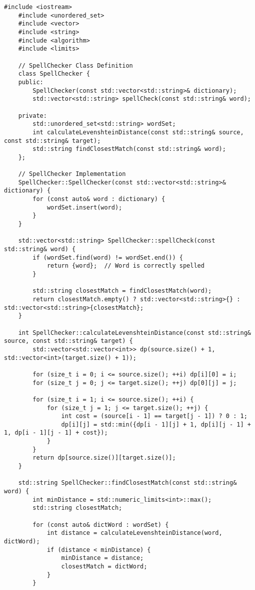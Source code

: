\documentclass{article}
\begin{document}
\begin{lstlisting}[caption={main.cpp}, label={lst:main}]
    #include <iostream>
    #include <unordered_set>
    #include <vector>
    #include <string>
    #include <algorithm>
    #include <limits>
    
    // SpellChecker Class Definition
    class SpellChecker {
    public:
        SpellChecker(const std::vector<std::string>& dictionary);
        std::vector<std::string> spellCheck(const std::string& word);
    
    private:
        std::unordered_set<std::string> wordSet;
        int calculateLevenshteinDistance(const std::string& source, const std::string& target);
        std::string findClosestMatch(const std::string& word);
    };
    
    // SpellChecker Implementation
    SpellChecker::SpellChecker(const std::vector<std::string>& dictionary) {
        for (const auto& word : dictionary) {
            wordSet.insert(word);
        }
    }
    
    std::vector<std::string> SpellChecker::spellCheck(const std::string& word) {
        if (wordSet.find(word) != wordSet.end()) {
            return {word};  // Word is correctly spelled
        }
        
        std::string closestMatch = findClosestMatch(word);
        return closestMatch.empty() ? std::vector<std::string>{} : std::vector<std::string>{closestMatch};
    }
    
    int SpellChecker::calculateLevenshteinDistance(const std::string& source, const std::string& target) {
        std::vector<std::vector<int>> dp(source.size() + 1, std::vector<int>(target.size() + 1));
    
        for (size_t i = 0; i <= source.size(); ++i) dp[i][0] = i;
        for (size_t j = 0; j <= target.size(); ++j) dp[0][j] = j;
    
        for (size_t i = 1; i <= source.size(); ++i) {
            for (size_t j = 1; j <= target.size(); ++j) {
                int cost = (source[i - 1] == target[j - 1]) ? 0 : 1;
                dp[i][j] = std::min({dp[i - 1][j] + 1, dp[i][j - 1] + 1, dp[i - 1][j - 1] + cost});
            }
        }
        return dp[source.size()][target.size()];
    }
    
    std::string SpellChecker::findClosestMatch(const std::string& word) {
        int minDistance = std::numeric_limits<int>::max();
        std::string closestMatch;
    
        for (const auto& dictWord : wordSet) {
            int distance = calculateLevenshteinDistance(word, dictWord);
            if (distance < minDistance) {
                minDistance = distance;
                closestMatch = dictWord;
            }
        }
        

\end{lstlisting}
\end{document}
